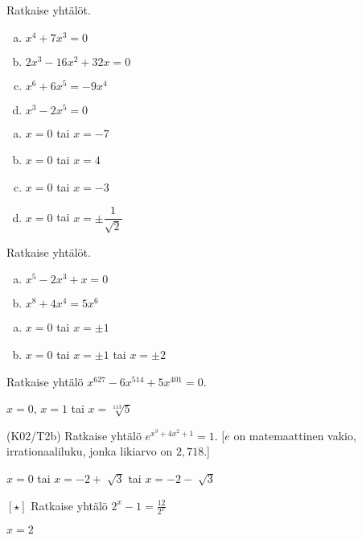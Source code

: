\begin{tehtava}
    Ratkaise yhtälöt.
    \begin{enumerate}[a)]
        \item $x^4 + 7x^3 = 0$
        \item $2x^3 - 16x^2 + 32x = 0$
        \item $x^6 + 6x^5 = -9x^4$
        \item $x^3 - 2x^5 = 0$      
    \end{enumerate}
    \begin{vastaus}
        \begin{enumerate}[a)]
        	\item $x = 0$ tai $x = -7$
        	\item $x = 0$ tai $x = 4$
        	\item $x = 0$ tai $x = -3$
            \item $x = 0$ tai $x = \pm\dfrac{1}{\sqrt{2}}$
        \end{enumerate}
    \end{vastaus}
\end{tehtava}

\begin{tehtava}
    Ratkaise yhtälöt.
    \begin{enumerate}[a)]
        \item $x^5 - 2x^3 + x = 0$
        \item $x^8 + 4x^4 = 5x^6$       
    \end{enumerate}
    \begin{vastaus}
        \begin{enumerate}[a)]
        	\item $x = 0$ tai $x = \pm1$
        	\item $x = 0$ tai $x = \pm1$ tai $x = \pm2$
        \end{enumerate}
    \end{vastaus}
\end{tehtava}

\begin{tehtava}
	Ratkaise yhtälö $x^{627} - 6x^{514} + 5x^{401} = 0$.
	\begin{vastaus}
		$x = 0$, $x = 1$ tai $x = \sqrt[113]{5}$
	\end{vastaus}
\end{tehtava}

\begin{tehtava}
	(K02/T2b) Ratkaise yhtälö $e^{x^3+4x^2+1}=1$. [$e$ on matemaattinen vakio, irrationaaliluku, jonka likiarvo on $2,718$.]
	\begin{vastaus}
	$x=0$ tai $x=-2 + \sqrt[]{3}$ tai $x=-2 - \sqrt[]{3}$
	\end{vastaus}
\end{tehtava}

\begin{tehtava}
	$[ \star ]$ Ratkaise yhtälö $2^x-1=\frac{12}{2^x}$
	\begin{vastaus}
	$x=2$
	\end{vastaus}
\end{tehtava}
